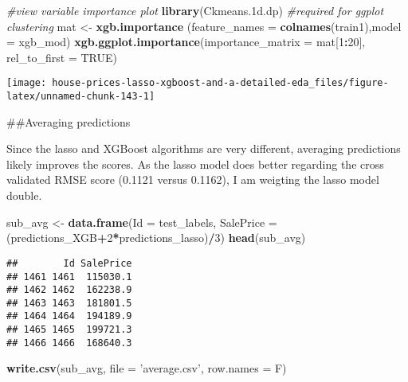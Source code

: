 \documentclass[]{article}
\newenvironment{Shaded}{\begin{snugshade}}{\end{snugshade}}
\newcommand{\CommentTok}[1]{\textcolor[rgb]{0.56,0.35,0.01}{\textit{#1}}}
\newcommand{\DataTypeTok}[1]{\textcolor[rgb]{0.13,0.29,0.53}{#1}}
\newcommand{\DecValTok}[1]{\textcolor[rgb]{0.00,0.00,0.81}{#1}}
\newcommand{\FloatTok}[1]{\textcolor[rgb]{0.00,0.00,0.81}{#1}}
\newcommand{\KeywordTok}[1]{\textcolor[rgb]{0.13,0.29,0.53}{\textbf{#1}}}
\newcommand{\NormalTok}[1]{#1}
\newcommand{\OperatorTok}[1]{\textcolor[rgb]{0.81,0.36,0.00}{\textbf{#1}}}
\newcommand{\OtherTok}[1]{\textcolor[rgb]{0.56,0.35,0.01}{#1}}
\newcommand{\StringTok}[1]{\textcolor[rgb]{0.31,0.60,0.02}{#1}}
\begin{document}
\begin{Shaded}
\begin{Highlighting}[]
\CommentTok{#view variable importance plot}
\KeywordTok{library}\NormalTok{(Ckmeans}\FloatTok{.1}\NormalTok{d.dp) }\CommentTok{#required for ggplot clustering}
\NormalTok{mat <-}\StringTok{ }\KeywordTok{xgb.importance}\NormalTok{ (}\DataTypeTok{feature_names =} \KeywordTok{colnames}\NormalTok{(train1),}\DataTypeTok{model =}\NormalTok{ xgb_mod)}
\KeywordTok{xgb.ggplot.importance}\NormalTok{(}\DataTypeTok{importance_matrix =}\NormalTok{ mat[}\DecValTok{1}\OperatorTok{:}\DecValTok{20}\NormalTok{], }\DataTypeTok{rel_to_first =} \OtherTok{TRUE}\NormalTok{)}
\end{Highlighting}
\end{Shaded}

\texttt{[image: house-prices-lasso-xgboost-and-a-detailed-eda\_files/figure-latex/unnamed-chunk-143-1]}

\#\#Averaging predictions

Since the lasso and XGBoost algorithms are very different, averaging
predictions likely improves the scores. As the lasso model does better
regarding the cross validated RMSE score (0.1121 versus 0.1162), I am
weigting the lasso model double.

\begin{Shaded}
\begin{Highlighting}[]
\NormalTok{sub_avg <-}\StringTok{ }\KeywordTok{data.frame}\NormalTok{(}\DataTypeTok{Id =}\NormalTok{ test_labels, }\DataTypeTok{SalePrice =}\NormalTok{ (predictions_XGB}\OperatorTok{+}\DecValTok{2}\OperatorTok{*}\NormalTok{predictions_lasso)}\OperatorTok{/}\DecValTok{3}\NormalTok{)}
\KeywordTok{head}\NormalTok{(sub_avg)}
\end{Highlighting}
\end{Shaded}

\begin{verbatim}
##        Id SalePrice
## 1461 1461  115030.1
## 1462 1462  162238.9
## 1463 1463  181801.5
## 1464 1464  194189.9
## 1465 1465  199721.3
## 1466 1466  168640.3
\end{verbatim}

\begin{Shaded}
\begin{Highlighting}[]
\KeywordTok{write.csv}\NormalTok{(sub_avg, }\DataTypeTok{file =} \StringTok{'average.csv'}\NormalTok{, }\DataTypeTok{row.names =}\NormalTok{ F)}
\end{Highlighting}
\end{Shaded}
\end{document}
